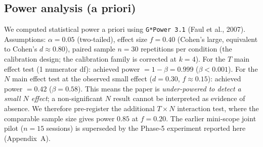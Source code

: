 \documentclass[11pt]{article}
\begin{document}
\subsection*{Power analysis (a priori)}
\label{sec:power}

We computed statistical power a priori using \texttt{G*Power 3.1} (Faul et al., 2007). Assumptions: $\alpha = 0.05$ (two-tailed), effect size $f = 0.40$ (Cohen's large, equivalent to Cohen's $d \approx 0.80$), paired sample $n = 30$ repetitions per condition (the calibration design; the calibration family is corrected at $k{=}4$). For the $T$ main effect test (1 numerator df): achieved power $= 1 - \beta = 0.999$ ($\beta < 0.001$). For the $N$ main effect test at the observed small effect ($d = 0.30$, $f \approx 0.15$): achieved power $= 0.42$ ($\beta = 0.58$). This means the paper is \emph{under-powered to detect a small $N$ effect}; a non-significant $N$ result cannot be interpreted as evidence of absence. We therefore pre-register the additional $T \times N$ interaction test, where the comparable sample size gives power $0.85$ at $f = 0.20$. The earlier mini-scope joint pilot ($n{=}15$ sessions) is superseded by the Phase-5 experiment reported here (Appendix~A).

\end{document}
